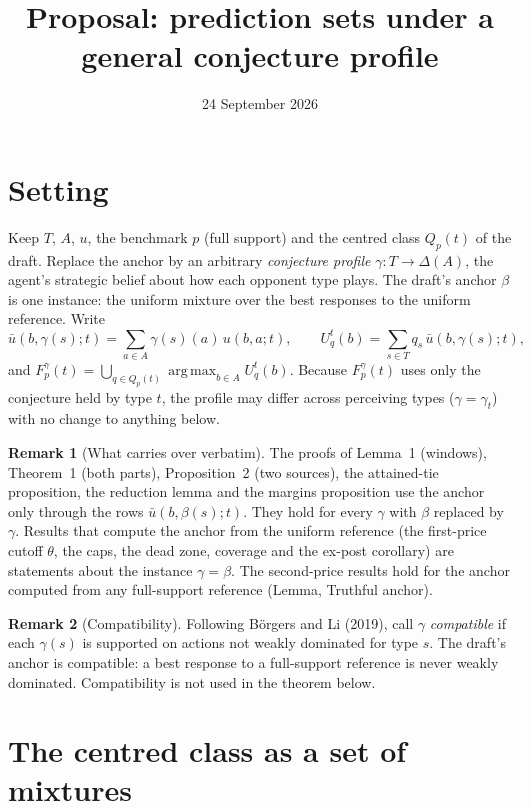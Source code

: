 \documentclass[11pt]{article}
\title{Proposal: prediction sets under a general conjecture profile}
\date{24 September 2026}
\theoremstyle{definition}
\newtheorem{remark}{Remark}
\DeclareMathOperator*{\argmax}{arg\,max}
\begin{document}
\maketitle

\section*{Setting}

Keep $T$, $A$, $u$, the benchmark $p$ (full support) and the centred class $Q_p(t)$ of
the draft. Replace the anchor by an arbitrary \emph{conjecture profile}
$\gamma : T \to \Delta(A)$, the agent's strategic belief about how each opponent type
plays. The draft's anchor $\beta$ is one instance: the uniform mixture over
the best responses to the uniform reference. Write
\[
\bar u(b,\gamma(s);t) = \sum_{a \in A} \gamma(s)(a)\, u(b,a;t), \qquad
U^t_q(b) = \sum_{s\in T} q_s\, \bar u(b,\gamma(s);t),
\]
and $F^\gamma_p(t) = \bigcup_{q \in Q_p(t)} \argmax_{b\in A} U^t_q(b)$. Because
$F^\gamma_p(t)$ uses only the conjecture held by type $t$, the profile may
differ across perceiving types ($\gamma = \gamma_t$) with no change to anything below.

\begin{remark}[What carries over verbatim]
The proofs of Lemma~1 (windows), Theorem~1 (both parts), Proposition~2 (two
sources), the attained-tie proposition, the reduction lemma and the margins
proposition use the anchor only through the rows $\bar u(b,\beta(s);t)$. They hold
for every $\gamma$ with $\beta$ replaced by $\gamma$. Results that compute the anchor
from the uniform reference (the first-price cutoff $\theta$, the caps, the dead zone,
coverage and the ex-post corollary) are statements about the instance
$\gamma = \beta$. The second-price results hold for the anchor computed from any
full-support reference (Lemma, Truthful anchor).
\end{remark}

\begin{remark}[Compatibility]
Following B\"orgers and Li (2019), call $\gamma$ \emph{compatible} if each $\gamma(s)$
is supported on actions not weakly dominated for type $s$. The draft's anchor is
compatible: a best response to a full-support reference is never weakly dominated.
Compatibility is not used in the theorem below.
\end{remark}

\section*{The centred class as a set of mixtures}
\end{document}
